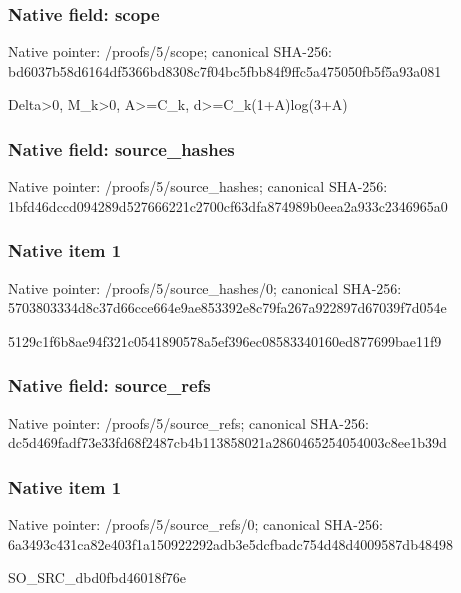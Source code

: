 \documentclass[10pt,a4paper]{article}
\begin{document}
\subsubsection{Native field: scope}
Native pointer: /proofs/5/scope; canonical SHA-256: bd6037b58d6164df5366bd8308c7f04bc5fbb84f9ffc5a475050fb5f5a93a081

\begingroup\raggedright\sloppy Delta>0,\allowbreak{} M\_\allowbreak{}k>0,\allowbreak{} A>=\allowbreak{}C\_\allowbreak{}k,\allowbreak{} d>=\allowbreak{}C\_\allowbreak{}k(1+A)log(3+A)\par\endgroup

\subsubsection{Native field: source\_\allowbreak{}hashes}
Native pointer: /proofs/5/source\_\allowbreak{}hashes; canonical SHA-256: 1bfd46dccd094289d527666221c2700cf63dfa874989b0eea2a933c2346965a0

\subsubsection{Native item 1}
Native pointer: /proofs/5/source\_\allowbreak{}hashes/0; canonical SHA-256: 5703803334d8c37d66cce664e9ae853392e8c79fa267a922897d67039f7d054e

\begingroup\raggedright\sloppy 5129c1f6b8ae94f321c0541890578a5ef396ec08583340160ed877699bae11f9\par\endgroup

\subsubsection{Native field: source\_\allowbreak{}refs}
Native pointer: /proofs/5/source\_\allowbreak{}refs; canonical SHA-256: dc5d469fadf73e33fd68f2487cb4b113858021a2860465254054003c8ee1b39d

\subsubsection{Native item 1}
Native pointer: /proofs/5/source\_\allowbreak{}refs/0; canonical SHA-256: 6a3493c431ca82e403f1a150922292adb3e5dcfbadc754d48d4009587db48498

\begingroup\raggedright\sloppy SO\_\allowbreak{}SRC\_\allowbreak{}dbd0fbd46018f76e\par\endgroup
\end{document}

